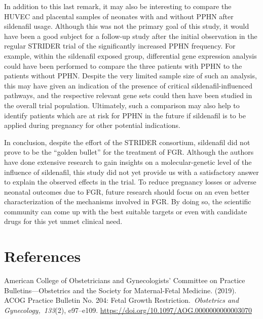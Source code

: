 \documentclass[authordate, reflection]{jote-new-article}
\begin{document}
	In addition to this last remark, it may also be interesting to compare the HUVEC and placental samples of neonates with and without PPHN after sildenafil usage. Although this was not the primary goal of this study, it would have been a good subject for a follow-up study after the initial observation in the regular STRIDER trial of the significantly increased PPHN frequency. For example, within the sildenafil exposed group, differential gene expression analysis could have been performed to compare the three patients with PPHN to the patients without PPHN. Despite the very limited sample size of such an analysis, this may have given an indication of the presence of critical sildenafil-influenced pathways, and the respective relevant gene sets could then have been studied in the overall trial population. Ultimately, such a comparison may also help to identify patients which are at risk for PPHN in the future if sildenafil is to be applied during pregnancy for other potential indications.



	In conclusion, despite the effort of the STRIDER consortium, sildenafil did not prove to be the “golden bullet” for the treatment of FGR. Although the authors have done extensive research to gain insights on a molecular-genetic level of the influence of sildenafil, this study did not yet provide us with a satisfactory answer to explain the observed effects in the trial. To reduce pregnancy losses or adverse neonatal outcomes due to FGR, future research should focus on an even better characterization of the mechanisms involved in FGR. By doing so, the scientific community can come up with the best suitable targets or even with candidate drugs for this yet unmet clinical need.











	\section{References}



	American College of Obstetricians and Gynecologists' Committee on Practice Bulletins—Obstetrics and the Society for Maternal-Fetal Medicine. (2019). ACOG Practice Bulletin No. 204: Fetal Growth Restriction. \emph{Obstetrics and Gynecology, 133}(2), e97--e109. \url{https://doi.org/10.1097/AOG.0000000000003070}
\end{document}
